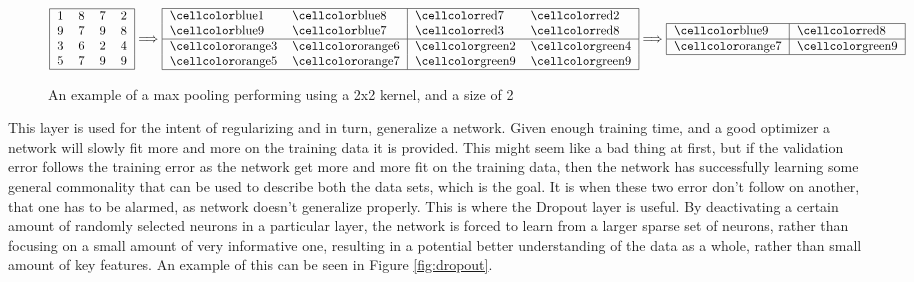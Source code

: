 \begin{description}
    \begin{figure}
    \centering
    \begin{equation}
        \begin{tabular}{|llll|}
        \hline
        1 & 8 & 7 & 2 \\ 
        9 & 7 & 9 & 8 \\ 
        3 & 6 & 2 & 4 \\ 
        5 & 7 & 9 & 9 \\\hline
        \end{tabular}
            \Longrightarrow
        \begin{tabular}{|ll|ll|}
        \hline
        \cc{blue}1 & \cc{blue}8 & \cc{red}7 & \cc{red}2 \\
        \cc{blue}9 & \cc{blue}7 & \cc{red}3 & \cc{red}8 \\ \hline
        \cc{orange}3 & \cc{orange}6 & \cc{green}2 & \cc{green}4 \\
        \cc{orange}5 & \cc{orange}7 & \cc{green}9 & \cc{green}9\\
        \hline
        \end{tabular}
            \Longrightarrow
        \begin{tabular}{|l|l|}
        \hline
        \cc{blue}9 & \cc{red}8\\\hline
        \cc{orange}7 & \cc{green}9\\
        \hline
        \end{tabular}
    \end{equation}
    \caption{An example of a max pooling performing using a 2x2 kernel, and a
    size of 2}
    \label{fig:max_pool}
    \end{figure}


    \item[Dropout Layer:] 

        This layer is used for the intent of regularizing and in turn,
        generalize a network. Given enough training time, and a good optimizer
        a network will slowly fit more and more on the training data it is
        provided. This might seem like a bad thing at first, but if the
        validation error follows the training error as the network get more
        and more fit on the training data, then the network has successfully
        learning some general commonality that can be used to describe both the
        data sets, which is the goal. It is when these two error don't follow
        on another, that one has to be alarmed, as network doesn't generalize
        properly. This is where the Dropout layer is useful. By deactivating a
        certain amount of randomly selected neurons in a particular layer, the
        network is forced to learn from a larger sparse set of neurons, rather
        than focusing on a small amount of very informative one, resulting in
        a potential better understanding of the data as a whole, rather than
        small amount of key features. An example of this can be seen in Figure
        \ref{fig:dropout}.


\end{description}
